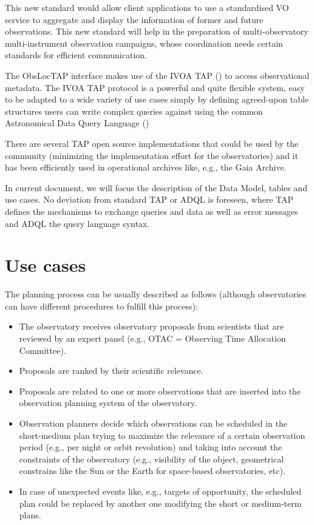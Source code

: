 \documentclass[11pt,a4paper]{ivoa}
\begin{document}
This new standard would allow client applications to use a standardised VO
service to aggregate and display the information of former and future
observations. This new standard will help in the preparation of
multi-observatory multi-instrument observation campaigns, whose
coordination needs certain standards for efficient communication.

The ObsLocTAP interface makes use of the IVOA TAP (\cite{2019ivoa.spec.0927D})
to access observational metadata. The IVOA TAP protocol is a powerful and quite
flexible system, easy to be adapted to a wide variety of use cases simply by
defining agreed-upon table structures users can write complex queries against
using the common Astronomical Data Query Language (\cite{2008ivoa.spec.1030O})

There are several TAP open source implementations that could be used by the
community (minimizing the implementation effort for the observatories) and it
has been efficiently used in operational archives like, e.g., the Gaia Archive.

In current document, we will focus the description of the Data Model, tables
and use cases. No deviation from standard TAP or ADQL is foreseen, where TAP
defines the mechanisms to exchange queries and data as well as error messages
and ADQL the query language syntax.

\section{Use cases}
The planning process can be usually described as follows (although observatories
can have different procedures to fulfill this process):

\begin{itemize}
	\item{The observatory receives observatory proposals from scientists that are
  reviewed by an expert panel (e.g., OTAC = Observing Time Allocation
  Committee).}

	\item{Proposals are ranked by their scientific relevance.}

	\item{Proposals are related to one or more observations that are inserted
  into the observation planning system of the observatory.}

	\item{Observation planners decide which observations can be scheduled in the
  short-medium plan trying to maximize the relevance of a certain observation
  period (e.g., per night or orbit revolution) and taking into account the
  constraints of the observatory (e.g., visibility of the object, geometrical
  constrains like the Sun or the Earth for space-based observatories, etc).}

	\item{In case of unexpected events like, e.g., targets of opportunity, the
  scheduled plan could be replaced by another one modifying the short or
  medium-term plans.}

\end{itemize}
\end{document}
